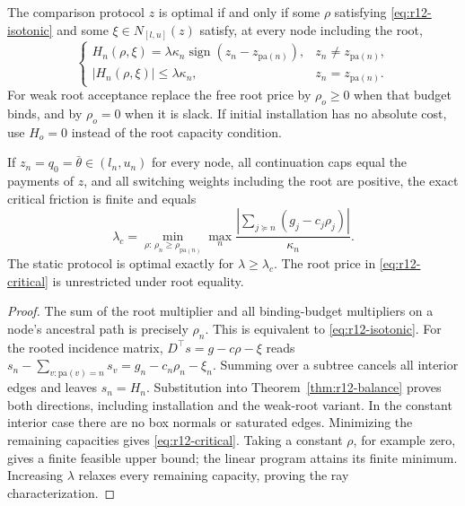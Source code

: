 \begin{corollary}\label{cor:r12-cuts}
The comparison protocol $z$ is optimal if and only if some $\rho$ satisfying \eqref{eq:r12-isotonic} and some $\xi\in N_{[l,u]}(z)$ satisfy, at every node including the root,
\begin{equation}\label{eq:r12-cut-cap}
 \begin{cases}
 H_n(\rho,\xi)=\lambda\kappa_n\operatorname{sign}(z_n-z_{\mathrm{pa}(n)}),
      &z_n\ne z_{\mathrm{pa}(n)},\\
 |H_n(\rho,\xi)|\leq\lambda\kappa_n,
      &z_n=z_{\mathrm{pa}(n)}.
 \end{cases}
\end{equation}
For weak root acceptance replace the free root price by $\rho_o\geq0$ when that budget binds, and by $\rho_o=0$ when it is slack. If initial installation has no absolute cost, use $H_o=0$ instead of the root capacity condition.

If $z_n=q_0=\bar\theta\in(l_n,u_n)$ for every node, all continuation caps equal the payments of $z$, and all switching weights including the root are positive, the exact critical friction is finite and equals
\begin{equation}\label{eq:r12-critical}
 \lambda_c=\min_{\rho:\,\rho_n\geq\rho_{\mathrm{pa}(n)}}
            \max_n\frac{|\sum_{j\succeq n}(g_j-c_j\rho_j)|}{\kappa_n}.
\end{equation}
The static protocol is optimal exactly for $\lambda\geq\lambda_c$. The root price in \eqref{eq:r12-critical} is unrestricted under root equality.
\end{corollary}
\begin{proof}
The sum of the root multiplier and all binding-budget multipliers on a node's ancestral path is precisely $\rho_n$. This is equivalent to \eqref{eq:r12-isotonic}. For the rooted incidence matrix, $D^\top s=g-c\rho-\xi$ reads
$s_n-\sum_{v:\mathrm{pa}(v)=n}s_v=g_n-c_n\rho_n-\xi_n$.
Summing over a subtree cancels all interior edges and leaves $s_n=H_n$. Substitution into Theorem~\ref{thm:r12-balance} proves both directions, including installation and the weak-root variant. In the constant interior case there are no box normals or saturated edges. Minimizing the remaining capacities gives \eqref{eq:r12-critical}. Taking a constant $\rho$, for example zero, gives a finite feasible upper bound; the linear program attains its finite minimum. Increasing $\lambda$ relaxes every remaining capacity, proving the ray characterization.
\end{proof}
